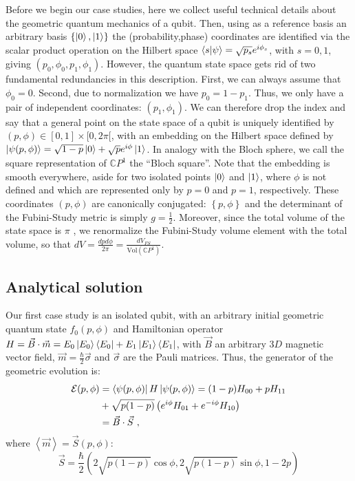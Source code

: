 \documentclass[%
 reprint,
 superscriptaddress,
 aps,
 pra,
]{revtex4-2}
\newcommand{\MV}[1]{\left\langle #1 \right\rangle}
\theoremstyle{definition}
\begin{document}
Before we begin our case studies, here we collect useful technical details
about the geometric quantum mechanics of a qubit. Then, using as a reference 
basis an arbitrary basis $\left\{ \ket{0},\ket{1}\right\}$ 
the (probability,phase) coordinates are identified via the scalar product operation
on the Hilbert space $\braket{s}{\psi} = \sqrt{p_s}e^{i\phi_s}$, with $s=0,1$, giving $(p_0,\phi_0,p_1,\phi_1)$. 
However, the quantum state space gets rid of two fundamental redundancies in this description.
First, we can always assume that $\phi_0 = 0$. Second, due to normalization we have
$p_0 = 1-p_1$. Thus, we only have a pair of independent coordinates: $(p_1,\phi_1)$.
We can therefore drop the index and say that a general point on the state space
of a qubit is uniquely identified by $(p,\phi) \in [0,1]\times[0,2\pi[$, with an embedding on the Hilbert space
defined by $\ket{\psi(p,\phi)} = \sqrt{1-p}\ket{0} + \sqrt{p}e^{i\phi}\ket{1}$. In analogy with 
the Bloch sphere, we call the square representation of $\mathbb{C}P^1$ the ``Bloch square''.
Note that the embedding is smooth everywhere, aside for two isolated points $\ket{0}$ and 
$\ket{1}$, where $\phi$ is not defined and which are represented only by $p=0$ and $p=1$, 
respectively. These coordinates $(p,\phi)$ are canonically conjugated: $\left\{ p,\phi\right\}$
and the determinant of the Fubini-Study metric is simply $g= \frac{1}{2}$. Moreover, since the total
volume of the state space is $\pi$ \cite{Bengtsson2017GeometryQuantumStates}, we renormalize the Fubini-Study volume element 
with the total volume, so that $dV = \frac{dpd\phi}{2\pi} = \frac{dV_{FS}}{\mathrm{Vol}(\mathbb{C}P^1)}$.


\subsection*{Analytical solution}

Our first case study is an isolated qubit, with an arbitrary initial geometric quantum 
state $f_0(p,\phi)$ and Hamiltonian operator $H = \vec{B} \cdot \vec{m} = E_0 \ket{E_0}\bra{E_0} + E_1 \ket{E_1}\bra{E_1}$,
with $\vec{B}$ an arbitrary $3D$ magnetic vector field, $\vec{m} = \frac{\hbar}{2}\vec{\sigma}$
and $\vec{\sigma}$ are the Pauli matrices. Thus, the generator of the geometric evolution is:
\begin{align}
\mathcal{E}(p,\phi) & = \bra{\psi(p,\phi)}H\ket{\psi(p,\phi)} = (1-p)H_{00} + p H_{11} \nonumber \\
&+ \sqrt{p(1-p)} \left(e^{i\phi}H_{01}+e^{-i\phi}H_{10} \right) \\
& = \vec{B} \cdot \vec{S} \nonumber~,
\end{align}
where $\MV{\vec{m}}=\vec{S}(p,\phi)$:
\begin{equation}
\vec{S}= \frac{\hbar}{2}\left( 2\sqrt{p(1-p)}\cos \phi, 2\sqrt{p(1-p)}\sin \phi , 1-2p\right)\nonumber
\end{equation}
\end{document}
